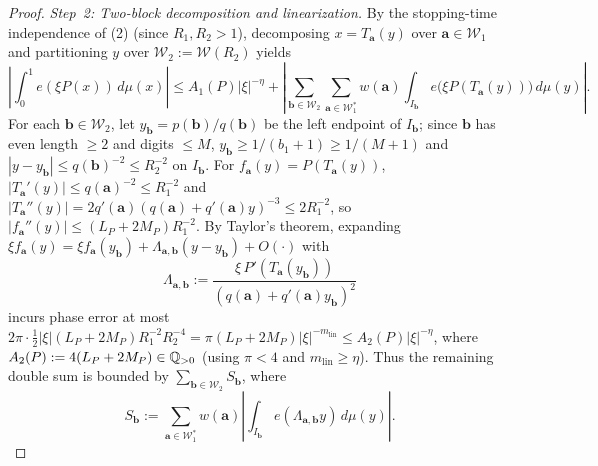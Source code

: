 \documentclass[11pt]{article}
\newcommand{\mlin}{m_{\mathrm{lin}}}
\begin{document}
\begin{proof}
\emph{Step~2: Two-block decomposition and linearization.}
By the stopping-time independence of (2) (since $R_1,R_2>1$), decomposing $x=T_{\mathbf{a}}(y)$ over $\mathbf{a}\in\mathcal{W}_1$ and partitioning $y$ over $\mathcal{W}_2:=\mathcal{W}(R_2)$ yields
\[
\left|\int_0^1 e(\xi P(x))\,d\mu(x)\right|\le A_1(P)|\xi|^{-\eta}+\left|\sum_{\mathbf{b}\in\mathcal{W}_2}\sum_{\mathbf{a}\in\mathcal{W}_1^*}w(\mathbf{a})\int_{I_{\mathbf{b}}}e\bigl(\xi P(T_{\mathbf{a}}(y))\bigr)\,d\mu(y)\right|.
\]
For each $\mathbf{b}\in\mathcal{W}_2$, let $y_{\mathbf{b}}=p(\mathbf{b})/q(\mathbf{b})$ be the left endpoint of $I_{\mathbf{b}}$; since $\mathbf{b}$ has even length $\ge2$ and digits $\le M$, $y_{\mathbf{b}}\ge1/(b_1+1)\ge1/(M+1)$ and $|y-y_{\mathbf{b}}|\le q(\mathbf{b})^{-2}\le R_2^{-2}$ on $I_{\mathbf{b}}$. For $f_{\mathbf{a}}(y)=P(T_{\mathbf{a}}(y))$, $|T_{\mathbf{a}}'(y)|\le q(\mathbf{a})^{-2}\le R_1^{-2}$ and $|T_{\mathbf{a}}''(y)|=2q'(\mathbf{a})(q(\mathbf{a})+q'(\mathbf{a})y)^{-3}\le 2R_1^{-2}$, so $|f_{\mathbf{a}}''(y)|\le(L_P+2M_P)R_1^{-2}$. By Taylor's theorem, expanding $\xi f_{\mathbf{a}}(y)=\xi f_{\mathbf{a}}(y_{\mathbf{b}})+\Lambda_{\mathbf{a},\mathbf{b}}(y-y_{\mathbf{b}})+O(\cdot)$ with
\[
\Lambda_{\mathbf{a},\mathbf{b}}:=\frac{\xi\,P'(T_{\mathbf{a}}(y_{\mathbf{b}}))}{(q(\mathbf{a})+q'(\mathbf{a})y_{\mathbf{b}})^2}
\]
incurs phase error at most $2\pi\cdot\frac12|\xi|(L_P+2M_P)R_1^{-2}R_2^{-4}=\pi(L_P+2M_P)|\xi|^{-\mlin}\le A_2(P)|\xi|^{-\eta}$, where $A_2(P):=4(L_P+2M_P)\in\mathbb Q_{>0}$ (using $\pi<4$ and $\mlin\ge\eta$). Thus the remaining double sum is bounded by $\sum_{\mathbf{b}\in\mathcal{W}_2}S_{\mathbf{b}}$, where
\[
S_{\mathbf{b}}:=\sum_{\mathbf{a}\in\mathcal{W}_1^*}w(\mathbf{a})\left|\int_{I_{\mathbf{b}}}e(\Lambda_{\mathbf{a},\mathbf{b}}y)\,d\mu(y)\right|.
\]


\end{proof}
\end{document}
